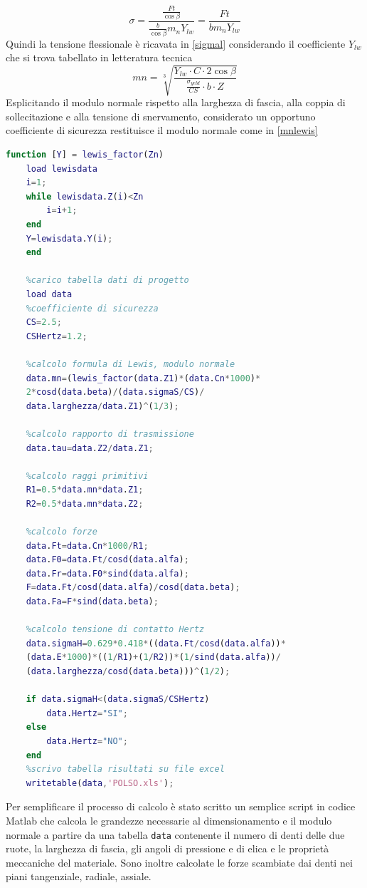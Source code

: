 \documentclass[%
corpo=11pt,
twoside,
 stile=classica,
oldstyle,
greek,%
]{toptesi}
\begin{document}
	\begin{equation}\label{sigmal}
	\sigma=\frac{\frac{Ft}{\cos\beta}}{\frac{b}{\cos\beta}m_{n}Y_{lw}}=\frac{Ft}{b m_{n}Y_{lw}}
	\end{equation}
	Quindi la tensione flessionale è ricavata in \ref{sigmal} considerando il coefficiente $Y_{lw}$ che si trova tabellato in letteratura tecnica
		\begin{equation}\label{mnlewis}
	mn=\sqrt[3]{\frac{Y_{lw} \cdot C \cdot 2 \cos\beta}{\frac{\sigma_{yeld}}{CS} \cdot b \cdot Z}}
	\end{equation}
	Esplicitando il modulo normale rispetto alla larghezza di fascia, alla coppia di sollecitazione e alla tensione di snervamento, considerato un opportuno coefficiente di sicurezza restituisce il modulo normale come in \ref{mnlewis}
	

	\begin{lstlisting}[language=Matlab]
	function [Y] = lewis_factor(Zn)
	load lewisdata
	i=1;
	while lewisdata.Z(i)<Zn
		i=i+1;
	end
	Y=lewisdata.Y(i);
	end
	
	%carico tabella dati di progetto 
	load data
	%coefficiente di sicurezza
	CS=2.5;
	CSHertz=1.2;
	
	%calcolo formula di Lewis, modulo normale
	data.mn=(lewis_factor(data.Z1)*(data.Cn*1000)*
	2*cosd(data.beta)/(data.sigmaS/CS)/
	data.larghezza/data.Z1)^(1/3);
	
	%calcolo rapporto di trasmissione
	data.tau=data.Z2/data.Z1;
	
	%calcolo raggi primitivi 
	R1=0.5*data.mn*data.Z1;
	R2=0.5*data.mn*data.Z2;
	
	%calcolo forze
	data.Ft=data.Cn*1000/R1;
	data.F0=data.Ft/cosd(data.alfa);
	data.Fr=data.F0*sind(data.alfa);
	F=data.Ft/cosd(data.alfa)/cosd(data.beta);
	data.Fa=F*sind(data.beta);
	
	%calcolo tensione di contatto Hertz
	data.sigmaH=0.629*0.418*((data.Ft/cosd(data.alfa))*
	(data.E*1000)*((1/R1)+(1/R2))*(1/sind(data.alfa))/
	(data.larghezza/cosd(data.beta)))^(1/2);
	
	if data.sigmaH<(data.sigmaS/CSHertz)
		data.Hertz="SI";
	else
		data.Hertz="NO";
	end
	%scrivo tabella risultati su file excel
	writetable(data,'POLSO.xls');
	\end{lstlisting}
	
		Per semplificare il processo di calcolo è stato scritto un semplice script in codice Matlab che calcola le grandezze necessarie al dimensionamento e il modulo normale a partire da una tabella \verb|data| contenente il numero di denti delle due ruote, la larghezza di fascia, gli angoli di pressione e di elica e le proprietà meccaniche del materiale. Sono inoltre calcolate le forze scambiate dai denti nei piani tangenziale, radiale, assiale.
	
\end{document}
